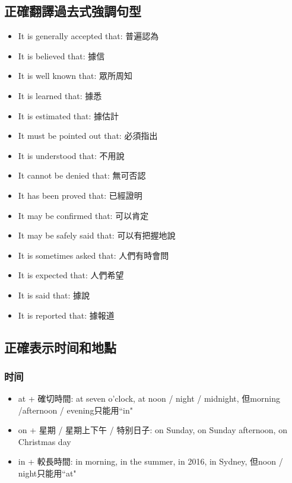 \subsection{正確翻譯過去式強調句型}
\begin{multicols}{2}
\begin{itemize}
  \itemsep0em
  \item It is generally accepted that: 普遍認為
  \item It is believed that: 據信
  \item It is well known that: 眾所周知
  \item It is learned that: 據悉
  \item It is estimated that: 據估計
  \item It must be pointed out that: 必須指出
  \item It is understood that: 不用說
  \item It cannot be denied that: 無可否認
  \item It has been proved that: 已經證明
  \item It may be confirmed that: 可以肯定
  \item It may be safely said that: 可以有把握地說
  \item It is sometimes asked that: 人們有時會問
  \item It is expected that: 人們希望
  \item It is said that: 據說
  \item It is reported that: 據報道
\end{itemize}
\end{multicols}

\subsection{正確表示时间和地點}
\subsubsection{时间}
\begin{itemize}
  \itemsep0em
  \item at + 確切時間: at seven o'clock, at noon / night / midnight, 但morning /afternoon / evening只能用``in"
  \item on + 星期 / 星期上下午 / 特别日子: on Sunday, on Sunday afternoon, on Christmas day
  \item in + 較長時間: in morning, in the summer, in 2016, in Sydney, 但noon / night只能用``at"
\end{itemize}

